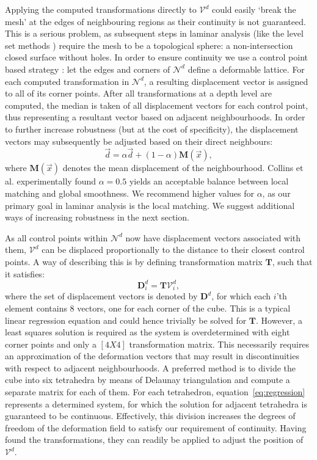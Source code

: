Applying the computed transformations directly to $\mathcal{V}^{d}$ could easily `break the mesh' at the edges of neighbouring regions as their continuity is not guaranteed. This is a serious problem, as subsequent steps in laminar analysis (like the level set methods \citep{Sethian1999}) require the mesh to be a topological sphere: a non-intersection closed surface without holes. In order to ensure continuity we use a control point based strategy \citep{Collins1995}: let the edges and corners of $\mathcal{N}^{d}$ define a deformable lattice. For each computed transformation in $\mathcal{N}^{d}$, a resulting displacement vector is assigned to all of its corner points. After all transformations at a depth level are computed, the median is taken of all displacement vectors for each control point, thus representing a resultant vector based on adjacent neighbourhoods. In order to further increase robustness (but at the cost of specificity), the displacement vectors may subsequently be adjusted based on their direct neighbours:
\begin{equation}
\vec{d}=\alpha \vec{d} + \left(1-\alpha\right) \mathbf{M}(\vec{x}),
\label{eq:alphasmoothing}
\end{equation}
where $\mathbf{M}(\vec{x})$ denotes the mean displacement of the neighbourhood. Collins et al. \citep{Collins1995} experimentally found $\alpha=0.5$ yields an acceptable balance between local matching and global smoothness. We recommend higher values for $\alpha$, as our primary goal in laminar analysis is the local matching. We suggest additional ways of increasing robustness in the next section.

As all control points within $\mathcal{N}^{d}$ now have displacement vectors associated with them, $\mathcal{V}^{d}$ can be displaced proportionally to the distance to their closest control points. A way of describing this is by defining transformation matrix $\mathbf{T}$, such that it satisfies:
\begin{equation}
\mathbf{D}_{i}^{d}=\mathbf{T}\mathcal{V}_{i}^{d},
\label{eq:regression}
\end{equation}
where the set of displacement vectors is denoted by $\mathbf{D}^{d}$, for which each $i$'th element contains 8 vectors, one for each corner of the cube. This is a typical linear regression equation and could hence trivially be solved for $\mathbf{T}$. However, a least squares solution is required as the system is overdetermined with eight corner points and only a $[4 X 4]$ transformation matrix. This necessarily requires an approximation of the deformation vectors that may result in discontinuities with respect to adjacent neighbourhoods. A preferred method is to divide the cube into six tetrahedra by means of Delaunay triangulation \citep{Delaunay1934} and compute a separate matrix for each of them. For each tetrahedron, equation~\ref{eq:regression} represents a determined system, for which the solution for adjacent tetrahedra is guaranteed to be continuous. Effectively, this division increases the degrees of freedom of the deformation field to satisfy our requirement of continuity. Having found the transformations, they can readily be applied to adjust the position of $\mathcal{V}^{d}$.

